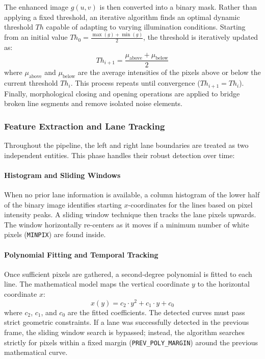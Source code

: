 \documentclass[12pt,a4paper]{article}
\begin{document}
The enhanced image $g(u,v)$ is then converted into a binary mask. Rather than applying a fixed threshold, an iterative algorithm finds an optimal dynamic threshold $Th$ capable of adapting to varying illumination conditions. Starting from an initial value $Th_0 = \frac{\max(g) + \min(g)}{2}$, the threshold is iteratively updated as:
\begin{equation}
    Th_{i+1} = \frac{\mu_{\text{above}} + \mu_{\text{below}}}{2}
\end{equation}
where $\mu_{\text{above}}$ and $\mu_{\text{below}}$ are the average intensities of the pixels above or below the current threshold $Th_i$. This process repeats until convergence ($Th_{i+1} = Th_i$). Finally, morphological closing and opening operations are applied to bridge broken line segments and remove isolated noise elements.

\subsubsection{Feature Extraction and Lane Tracking}
Throughout the pipeline, the left and right lane boundaries are treated as two independent entities. This phase handles their robust detection over time:

\paragraph{Histogram and Sliding Windows}
When no prior lane information is available, a column histogram of the lower half of the binary image identifies starting $x$-coordinates for the lines based on pixel intensity peaks. A sliding window technique then tracks the lane pixels upwards. The window horizontally re-centers as it moves if a minimum number of white pixels (\texttt{MINPIX}) are found inside.

\paragraph{Polynomial Fitting and Temporal Tracking}
Once sufficient pixels are gathered, a second-degree polynomial is fitted to each line. The mathematical model maps the vertical coordinate $y$ to the horizontal coordinate $x$:
\begin{equation}
    x(y) = c_2 \cdot y^2 + c_1 \cdot y + c_0
\end{equation}
where $c_2$, $c_1$, and $c_0$ are the fitted coefficients. The detected curves must pass strict geometric constraints. If a lane was successfully detected in the previous frame, the sliding window search is bypassed; instead, the algorithm searches strictly for pixels within a fixed margin (\texttt{PREV\_POLY\_MARGIN}) around the previous mathematical curve.
\end{document}
